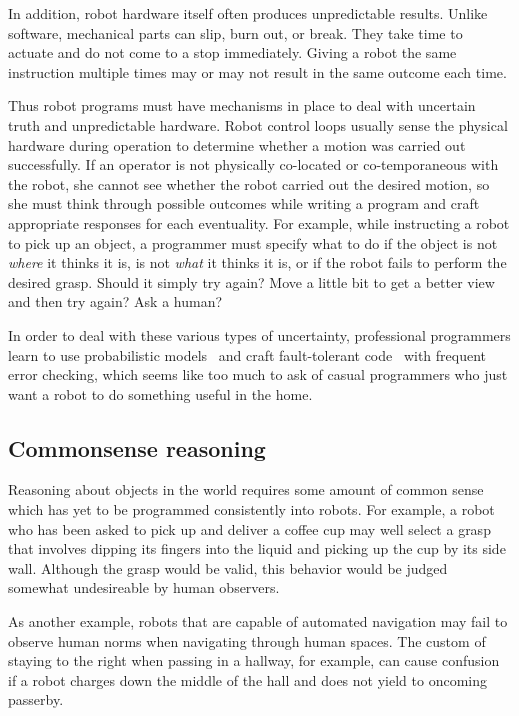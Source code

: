 \documentclass[10pt,twocolumn]{article}
\begin{document}
In addition, robot hardware itself often produces unpredictable results. Unlike software, mechanical parts can slip, burn out, or break. They take time to actuate and do not come to a stop immediately. Giving a robot the same instruction multiple times may or may not result in the same outcome each time.

Thus robot programs must have mechanisms in place to deal with uncertain truth and unpredictable hardware. Robot control loops usually sense the physical hardware during operation to determine whether a motion was carried out successfully.
If an operator is not physically co-located or co-temporaneous with the robot,
she cannot see whether the robot carried out the desired motion, so she must think through possible outcomes while writing a program and craft appropriate responses for each eventuality. For example, while instructing a robot to pick up an object, a programmer must specify what to do if the object is not {\em where} it thinks it is, is not {\em what} it thinks it is, or if the robot fails to perform the desired grasp. Should it simply try again? Move a little bit to get a better view and then try again? Ask a human?

In order to deal with these various types of uncertainty, professional programmers learn to use probabilistic models~\cite{darwiche-cacm10} and craft fault-tolerant code~\cite{wright-cacm09} with frequent error checking, which seems like too much to ask of casual programmers who just want a robot to do something useful in the home.


\subsection{Commonsense reasoning}

Reasoning about objects in the world requires some amount of common sense which has yet to be programmed consistently into robots. For example, a robot who has been asked to pick up and deliver a coffee cup may well select a grasp that involves dipping its fingers into the liquid and picking up the cup by its side wall. Although the grasp would be valid, this behavior would be judged somewhat undesireable by human observers.

As another example, robots that are capable of automated navigation may fail to observe human norms when navigating through human spaces. The custom of staying to the right when passing in a hallway, for example, can cause confusion if a robot charges down the middle of the hall and does not yield to oncoming passerby.
\end{document}
